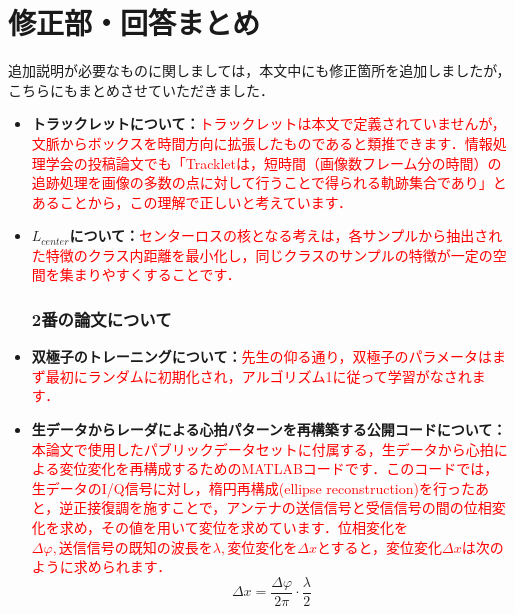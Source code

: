 \documentclass[dvipdfmx]{jsarticle}
\begin{document}
\section*{修正部・回答まとめ}
追加説明が必要なものに関しましては，本文中にも修正箇所を追加しましたが，こちらにもまとめさせていただきました．
\begin{itemize}
    \subsubsection*{1番の論文について}
    \item \textbf{トラックレットについて：}\textcolor{red}{トラックレットは本文で定義されていませんが，文脈からボックスを時間方向に拡張したものであると類推できます．情報処理学会の投稿論文\cite{tracklet}でも「Trackletは，短時間（画像数フレーム分の時間）の追跡処理を画像の多数の点に対して行うことで得られる軌跡集合であり」とあることから，この理解で正しいと考えています．}
    \item \textbf{$L_{center}$について：}\textcolor{red}{センターロスの核となる考えは，各サンプルから抽出された特徴のクラス内距離を最小化し，同じクラスのサンプルの特徴が一定の空間を集まりやすくすることです．}
    
    \subsubsection*{2番の論文について}
    \item \textbf{双極子のトレーニングについて：}\textcolor{red}{先生の仰る通り，双極子のパラメータはまず最初にランダムに初期化され，アルゴリズム1に従って学習がなされます．}
    \item \textbf{生データからレーダによる心拍パターンを再構築する公開コードについて：}\textcolor{red}{本論文で使用したパブリックデータセット\cite{dataset}に付属する，生データから心拍による変位変化を再構成するためのMATLABコードです．このコードでは，生データのI/Q信号に対し，楕円再構成(ellipse reconstruction)を行ったあと，逆正接復調を施すことで，アンテナの送信信号と受信信号の間の位相変化を求め，その値を用いて変位を求めています．位相変化を$\Delta \varphi, 送信信号の既知の波長を\lambda, 変位変化を\Delta x$とすると，変位変化$\Delta x$は次のように求められます．}
    \begin{equation}\label{}
    \Delta x = \frac{\Delta \varphi}{2 \pi} \cdot \frac{\lambda}{2}
    \end{equation}


\end{itemize}
\end{document}
